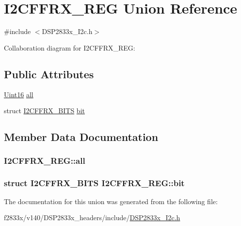 \hypertarget{union_i2_c_f_f_r_x___r_e_g}{}\section{I2\+C\+F\+F\+R\+X\+\_\+\+R\+E\+G Union Reference}
\label{union_i2_c_f_f_r_x___r_e_g}


{\ttfamily \#include $<$D\+S\+P2833x\+\_\+\+I2c.\+h$>$}



Collaboration diagram for I2\+C\+F\+F\+R\+X\+\_\+\+R\+E\+G\+:
\subsection*{Public Attributes}
\begin{DoxyCompactItemize}
\item 
\hyperlink{_d_s_p2833x___device_8h_a59a9f6be4562c327cbfb4f7e8e18f08b}{Uint16} \hyperlink{union_i2_c_f_f_r_x___r_e_g_afc3121b4a10a73784105f54bdb0e7c16}{all}
\item 
struct \hyperlink{struct_i2_c_f_f_r_x___b_i_t_s}{I2\+C\+F\+F\+R\+X\+\_\+\+B\+I\+T\+S} \hyperlink{union_i2_c_f_f_r_x___r_e_g_ad75fdf8650a6c6271afde543338414a5}{bit}
\end{DoxyCompactItemize}


\subsection{Member Data Documentation}
\hypertarget{union_i2_c_f_f_r_x___r_e_g_afc3121b4a10a73784105f54bdb0e7c16}{}
\subsubsection[{all}]{ I2\+C\+F\+F\+R\+X\+\_\+\+R\+E\+G\+::all}\label{union_i2_c_f_f_r_x___r_e_g_afc3121b4a10a73784105f54bdb0e7c16}
\hypertarget{union_i2_c_f_f_r_x___r_e_g_ad75fdf8650a6c6271afde543338414a5}{}
\subsubsection[{bit}]{\setlength{\rightskip}{0pt plus 5cm}struct {\bf I2\+C\+F\+F\+R\+X\+\_\+\+B\+I\+T\+S} I2\+C\+F\+F\+R\+X\+\_\+\+R\+E\+G\+::bit}\label{union_i2_c_f_f_r_x___r_e_g_ad75fdf8650a6c6271afde543338414a5}


The documentation for this union was generated from the following file\+:\begin{DoxyCompactItemize}
\item 
f2833x/v140/\+D\+S\+P2833x\+\_\+headers/include/\hyperlink{_d_s_p2833x___i2c_8h}{D\+S\+P2833x\+\_\+\+I2c.\+h}\end{DoxyCompactItemize}
